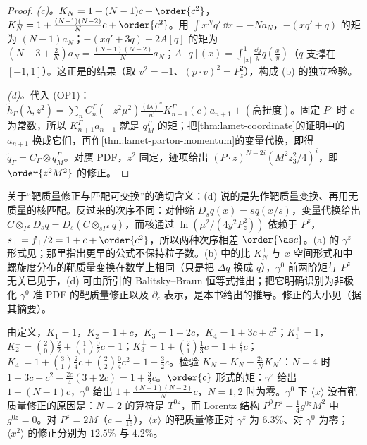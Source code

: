 \begin{proof}
\emph{(c)。}$K_N=1+(N-1)c+\order{c^2}$，$K^\perp_N=1+\frac{(N-1)(N-2)}Nc+\order{c^2}$。用 $\int x^Nq'\,\dd x=-Na_N$，$-(xq'+q)$ 的矩为 $(N-1)a_N$；$-(xq'+3q)+2A[q]$ 的矩为 $(N-3+\frac2N)a_N=\frac{(N-1)(N-2)}Na_N$；$A[q](x)=\int_{|x|}^1\frac{\dd y}yq(\frac xy)$（$q$ 支撑在 $[-1,1]$）。这正是\cite{Braun:2018brg}的结果（取 $v^2=-1$、$(p\cdot v)^2=P_z^2$），构成 (b) 的独立检验。

\emph{(d)。}代入 (OP1)：$\tilde h_\Gamma(\lambda,z^2)=\sum_nC^\Gamma_n(-z^2\mu^2)\frac{(\ii\lambda)^n}{n!}K^\Gamma_{n+1}(c)a_{n+1}+(\text{高扭度})$。固定 $P^z$ 时 $c$ 为常数，所以 $K^\Gamma_{n+1}a_{n+1}$ 就是 $q^\Gamma_M$ 的矩；把\cref{thm:lamet-coordinate}的证明中的 $a_{n+1}$ 换成它们，再作\cref{thm:lamet-parton-momentum}的变量代换，即得 $\tilde q_\Gamma=C_\Gamma\otimes q^\Gamma_M$。对赝 PDF，$z^2$ 固定，迹项给出 $(P\cdot z)^{N-2i}(M^2z_3^2/4)^i$，即 $\order{z^2M^2}$ 的修正。
\end{proof}

关于“靶质量修正与匹配可交换”的确切含义：(d) 说的是先作靶质量变换、再用无质量的核匹配。反过来的次序不同：对伸缩 $D_sq(x)=sq(x/s)$，变量代换给出 $C\otimes_{P^z}D_sq=D_s(C\otimes_{sP^z}q)$，而核通过 $\ln(\mu^2/(4y^2P_z^2))$ 依赖于 $P^z$，$s_+=f_+/2=1+c+\order{c^2}$，所以两种次序相差 $\order{\as c}$。(a) 的 $\gamma^z$ 形式见\cite[附录~B]{Chen:2016utp}；那里指出更早的公式\cite{Alexandrou:2015rja}不保持粒子数。(b) 中的比 $K^\perp_N$ 与 $x$ 空间形式和\cite{Chen:2016utp}中螺旋度分布的靶质量变换在数学上相同（只是把 $\Delta q$ 换成 $q$），$\gamma^0$ 前两阶矩与 $P^z$ 无关已见于\cite{Bhattacharya:2019cme}，(d) 可由\cite{Braun:2018brg}所引的 Balitsky--Braun 恒等式推出；把它明确识别为非极化 $\gamma^0$ 准 PDF 的靶质量修正以及 $\partial_c$ 表示，是本书给出的推导。修正的大小见\cite{Radyushkin:2017ffo}（据其摘要）。

\begin{example}[$K_N$ 与 $K^\perp_N$（$N\le4$）]\label{ex:lamet-tmc-moments}
由定义，$K_1=1$，$K_2=1+c$，$K_3=1+2c$，$K_4=1+3c+c^2$；$K^\perp_1=1$，$K^\perp_2=\binom20\frac22+\binom11\frac02c=1$；$K^\perp_3=1+\binom21\frac13c=1+\frac23c$；$K^\perp_4=1+\binom31\frac24c+\binom22\frac04c^2=1+\frac32c$。检验 $K^\perp_N=K_N-\frac{2c}NK_N'$：$N=4$ 时 $1+3c+c^2-\frac{2c}4(3+2c)=1+\frac32c$。$\order{c}$ 形式的矩：$\gamma^z$ 给出 $1+(N-1)c$，$\gamma^0$ 给出 $1+\frac{(N-1)(N-2)}Nc$，$N=1,2$ 时为零。$\gamma^0$ 下 $\langle x\rangle$ 没有靶质量修正的原因是：$N=2$ 的算符是 $T^{0z}$，而 Lorentz 结构 $P^0P^z-\frac14g^{0z}M^2$ 中 $g^{0z}=0$。对 $P^z=2M$（$c=\frac1{16}$），$\langle x\rangle$ 的靶质量修正对 $\gamma^z$ 为 $6.3\%$、对 $\gamma^0$ 为零；$\langle x^2\rangle$ 的修正分别为 $12.5\%$ 与 $4.2\%$。
\end{example}

